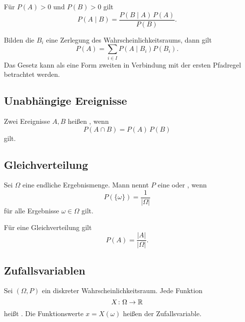  Für $P(A)>0$ und $P(B)>0$ gilt%
\begin{equation}
P(A\mid B) = \frac{P(B\mid A)\, P(A)}{P(B)}.
\end{equation}

 Bilden die $B_i$
eine Zerlegung des Wahrscheinlichkeitsraums, dann gilt%
\begin{equation}
P(A) = \sum_{i\in I} P(A\mid B_i)P(B_i).
\end{equation}
Das Gesetz kann als eine Form zweiten in Verbindung mit
der ersten Pfadregel betrachtet werden.


\newpage
\subsection{Unabhängige Ereignisse}
\begin{definition}\mbox{}\newline%
Zwei Ereignisse $A,B$ heißen , wenn%
\begin{equation}
P(A\cap B) = P(A)\, P(B)
\end{equation}
gilt.
\end{definition}

\subsection{Gleichverteilung}
\begin{definition}%
\mbox{}\newline{}
Sei $\Omega$ eine endliche Ergebnismenge. Mann nennt $P$ eine
 oder , wenn%
\begin{equation}
P(\{\omega\}) = \frac{1}{|\Omega|}
\end{equation}
für alle Ergebnisse $\omega\in\Omega$ gilt.
\end{definition}

\noindent
Für eine Gleichverteilung gilt
\begin{equation}
P(A) = \frac{|A|}{|\Omega|}.
\end{equation}

\subsection{Zufallsvariablen}
\begin{definition}[Zufallsvariable]\mbox{}\newline
Sei $(\Omega,P)$ ein diskreter Wahrscheinlichkeitsraum. Jede Funktion%
\begin{equation}
X\colon\Omega\to\mathbb R
\end{equation}
heißt . Die Funktionswerte $x=X(\omega)$ heißen
 der Zufallsvariable.
\end{definition}

